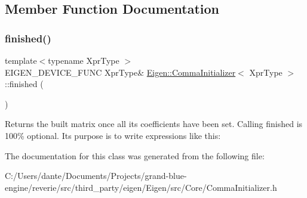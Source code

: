 \subsection{Member Function Documentation}
\mbox{\label{struct_eigen_1_1_comma_initializer_a3be7de7fb3e8d3c4d3063f480181b17f}} 
\subsubsection{\texorpdfstring{finished()}{finished()}}
{\footnotesize\ttfamily template$<$typename Xpr\+Type $>$ \\
E\+I\+G\+E\+N\+\_\+\+D\+E\+V\+I\+C\+E\+\_\+\+F\+U\+NC Xpr\+Type\& \mbox{\hyperlink{struct_eigen_1_1_comma_initializer}{Eigen\+::\+Comma\+Initializer}}$<$ Xpr\+Type $>$\+::finished (\begin{DoxyParamCaption}{ }\end{DoxyParamCaption})\hspace{0.3cm}{\ttfamily [inline]}}

\begin{DoxyReturn}{Returns}
the built matrix once all its coefficients have been set. Calling finished is 100\% optional. Its purpose is to write expressions like this\+: 
\begin{DoxyCode}{0}
\end{DoxyCode}
 
\end{DoxyReturn}


The documentation for this class was generated from the following file\+:\begin{DoxyCompactItemize}
\item 
C\+:/\+Users/dante/\+Documents/\+Projects/grand-\/blue-\/engine/reverie/src/third\+\_\+party/eigen/\+Eigen/src/\+Core/Comma\+Initializer.\+h\end{DoxyCompactItemize}
